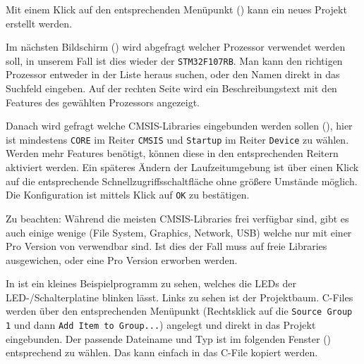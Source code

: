 
Mit einem Klick auf den entsprechenden Menüpunkt () kann ein neues \uVision{} Projekt erstellt werden.


Im nächsten Bildschirm () wird abgefragt welcher Prozessor verwendet werden soll, in unserem Fall ist dies wieder der \texttt{STM32F107RB}. Man kann den richtigen Prozessor entweder in der Liste heraus suchen, oder den Namen direkt in das Suchfeld eingeben. Auf der rechten Seite wird ein Beschreibungstext mit den Features des gewählten Prozessors angezeigt.


Danach wird gefragt welche \gls{CMSIS}-Libraries eingebunden werden sollen (), hier ist mindestens \texttt{CORE} im Reiter \texttt{CMSIS} und \texttt{Startup} im Reiter \texttt{Device} zu wählen. Werden mehr Features benötigt, können diese in den entsprechenden Reitern aktiviert werden. Ein späteres Ändern der Laufzeitumgebung ist über einen Klick auf die entsprechende Schnellzugriffsschaltfläche ohne größere Umstände möglich. Die Konfiguration ist mittels Klick auf \texttt{OK} zu bestätigen.

\begin{warning}
  Zu beachten: Während die meisten \gls{CMSIS}-Libraries frei verfügbar sind, gibt es auch einige wenige (File System, Graphics, Network, USB) welche nur mit einer Pro Version von \uVision{} verwendbar sind. Ist dies der Fall muss auf freie Libraries ausgewichen, oder eine Pro Version erworben werden.
\end{warning}


In  ist ein kleines Beispielprogramm zu sehen, welches die LEDs der LED-/Schalterplatine blinken lässt. Links zu sehen ist der Projektbaum. \gls{C}-Files werden über den entsprechenden Menüpunkt (Rechtsklick auf die \texttt{Source Group 1} und dann \texttt{Add Item to Group...}) angelegt und direkt in das Projekt eingebunden. Der passende Dateiname und Typ ist im folgenden Fenster () entsprechend zu wählen. Das  kann einfach in das \gls{C}-File kopiert werden.

